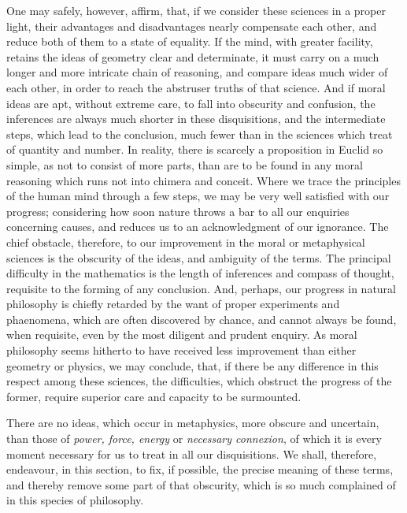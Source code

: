 \documentclass[]{article}
\begin{document}
\begin{sectionbody}
\humeparagraph  One may safely, however, affirm, that, if we consider these sciences in a proper light, their advantages and disadvantages nearly compensate each other, and reduce both of them to a state of equality. If the mind, with greater facility, retains the ideas of geometry clear and determinate, it must carry on a much longer and more intricate chain of reasoning, and compare ideas much wider of each other, in order to reach the abstruser truths of that science. And if moral ideas are apt, without extreme care, to fall into obscurity and confusion, the inferences are always much shorter in these disquisitions, and the intermediate steps, which lead to the conclusion, much fewer than in the sciences which treat of quantity and number. In reality, there is scarcely a proposition in Euclid so simple, as not to consist of more parts, than are to be found in any moral reasoning which runs not into chimera and conceit. Where we trace the principles of the human mind through a few steps, we may be very well satisfied with our progress; considering how soon nature throws a bar to all our enquiries concerning causes, and reduces us to an acknowledgment of our ignorance. The chief obstacle, therefore, to our improvement in the moral or metaphysical sciences is the obscurity of the ideas, and ambiguity of the terms. The principal difficulty in the mathematics is the length of inferences and compass of thought, requisite to the forming of any conclusion. And, perhaps, our progress in natural philosophy is chiefly retarded by the want of proper experiments and phaenomena, which are often discovered by chance, and cannot always be found, when requisite, even by the most diligent and prudent enquiry. As moral philosophy seems hitherto to have received less improvement than either geometry or physics, we may conclude, that, if there be any difference in this respect among these sciences, the difficulties, which obstruct the progress of the former, require superior care and capacity to be surmounted.

\humeparagraph  There are no ideas, which occur in metaphysics, more obscure and uncertain, than those of \emph{power, force, energy} or \emph{necessary connexion}, of which it is every moment necessary for us to treat in all our disquisitions. We shall, therefore, endeavour, in this section, to fix, if possible, the precise meaning of these terms, and thereby remove some part of that obscurity, which is so much complained of in this species of philosophy.


\end{sectionbody}
\end{document}
